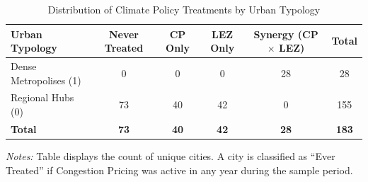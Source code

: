 \begin{table}[htbp]
\centering
\caption{Distribution of Climate Policy Treatments by Urban Typology}
\label{tab:treatment_by_cluster}
\begin{tabular}{lccccc}
\toprule
Urban Typology & Never Treated & CP Only & LEZ Only & Synergy (CP $\times$ LEZ) & Total \\
\midrule
Dense Metropolises (1) & 0 & 0 & 0 & 28 & 28 \\
Regional Hubs (0) & 73 & 40 & 42 & 0 & 155 \\
\midrule
\textbf{Total} & \textbf{73} & \textbf{40} & \textbf{42} & \textbf{28} & \textbf{183} \\
\bottomrule
\end{tabular}

\vspace{1ex}
{\raggedright \footnotesize \textit{Notes:} Table displays the count of unique cities.
A city is classified as ``Ever Treated'' if Congestion Pricing was active in any year during the sample period.\par}
\end{table}
